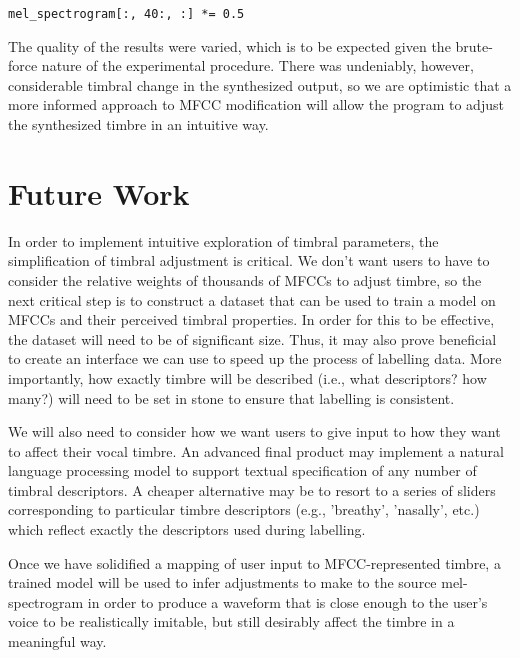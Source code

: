 \documentclass{article}
\begin{document}
\begin{verbatim}
mel_spectrogram[:, 40:, :] *= 0.5
\end{verbatim}

The quality of the results were varied, which is to be expected given the brute-force nature of the experimental procedure. There was undeniably, however, considerable timbral change in the synthesized output, so we are optimistic that a more informed approach to MFCC modification will allow the program to adjust the synthesized timbre in an intuitive way.


\section{Future Work}\label{sec:page_size}

In order to implement intuitive exploration of timbral parameters, the simplification of timbral adjustment is critical. We don't want users to have to consider the relative weights of thousands of MFCCs to adjust timbre, so the next critical step is to construct a dataset that can be used to train a model on MFCCs and their perceived timbral properties. In order for this to be effective, the dataset will need to be of significant size. Thus, it may also prove beneficial to create an interface we can use to speed up the process of labelling data. More importantly, how exactly timbre will be described (i.e., what descriptors? how many?) will need to be set in stone to ensure that labelling is consistent.

We will also need to consider how we want users to give input to how they want to affect their vocal timbre. An advanced final product may implement a natural language processing model to support textual specification of any number of timbral descriptors. A cheaper alternative may be to resort to a series of sliders corresponding to particular timbre descriptors (e.g., 'breathy', 'nasally', etc.) which reflect exactly the descriptors used during labelling.

Once we have solidified a mapping of user input to MFCC-represented timbre, a trained model will be used to infer adjustments to make to the source mel-spectrogram in order to produce a waveform that is close enough to the user's voice to be realistically imitable, but still desirably affect the timbre in a meaningful way.
\end{document}
